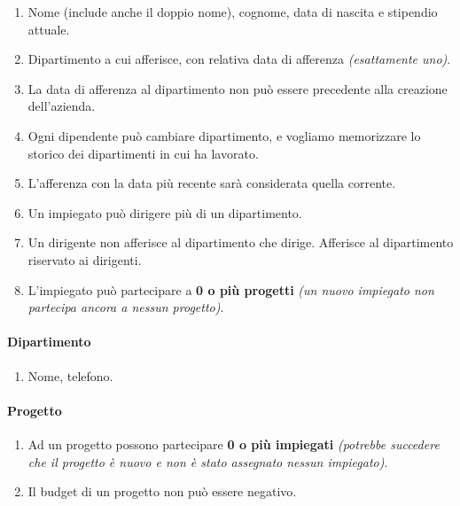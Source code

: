\documentclass{article}
\begin{document}
\begin{enumerate}
    \item Nome (include anche il doppio nome), cognome, data di nascita e stipendio attuale. 
    \item Dipartimento a cui afferisce, con relativa data di afferenza \textit{(esattamente uno)}.
    \item La data di afferenza al dipartimento non può essere precedente alla creazione dell'azienda.
    \item Ogni dipendente può cambiare dipartimento, e vogliamo memorizzare lo storico dei dipartimenti in cui ha lavorato.
    \item L'afferenza con la data più recente sarà considerata 
    quella corrente.
    \item Un impiegato può dirigere più di un dipartimento.
    \item Un dirigente non afferisce al dipartimento che dirige. Afferisce al dipartimento riservato ai dirigenti.
    \item L'impiegato può partecipare a \textbf{0 o più progetti} \textit{(un nuovo impiegato non partecipa ancora a nessun progetto)}.
\end{enumerate}

\paragraph{Dipartimento}

\begin{enumerate}
    \item Nome, telefono.
\end{enumerate}

\paragraph{Progetto}

\begin{enumerate}
    \item Ad un progetto possono partecipare \textbf{0 o più impiegati} \textit{(potrebbe succedere che il progetto è nuovo e non è stato assegnato nessun impiegato)}.
    \item Il budget di un progetto non può essere negativo. 
\end{enumerate}

\end{document}
